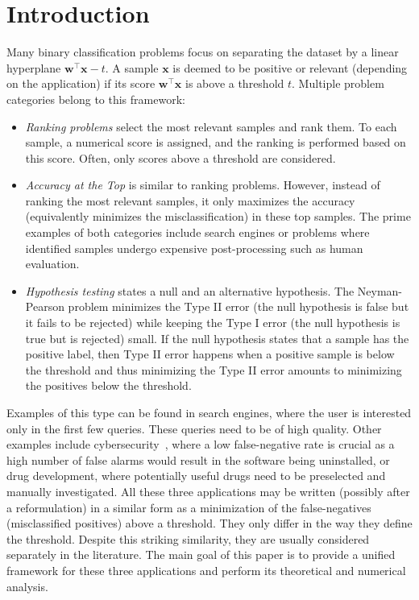\chapter{Introduction}

Many binary classification problems focus on separating the dataset by a linear hyperplane $\bm{w}^\top \bm{x} - t$. A sample $\bm{x}$ is deemed to be positive or relevant (depending on the application) if its score $\bm{w}^\top \bm{x}$ is above a threshold $t$. Multiple problem categories belong to this framework:
\begin{itemize}
  \item \textit{Ranking problems} select the most relevant samples and rank them. To each sample, a numerical score is assigned, and the ranking is performed based on this score. Often, only scores above a threshold are considered.
  \item \textit{Accuracy at the Top} is similar to ranking problems. However, instead of ranking the most relevant samples, it only maximizes the accuracy (equivalently minimizes the misclassification) in these top samples. The prime examples of both categories include search engines or problems where identified samples undergo expensive post-processing such as human evaluation.
  \item \textit{Hypothesis testing} states a null and an alternative hypothesis. The Neyman-Pearson problem minimizes the Type II error (the null hypothesis is false but it fails to be rejected) while keeping the Type I error (the null hypothesis is true but is rejected) small. If the null hypothesis states that a sample has the positive label, then Type II error happens when a positive sample is below the threshold and thus minimizing the Type II error amounts to minimizing the positives below the threshold.
\end{itemize}
Examples of this type can be found in search engines, where the user is interested only in the first few queries. These queries need to be of high quality. Other examples include cybersecurity~\cite{grill2016learning}, where a low false-negative rate is crucial as a high number of false alarms would result in the software being uninstalled, or drug development, where potentially useful drugs need to be preselected and manually investigated. All these three applications may be written (possibly after a reformulation) in a similar form as a minimization of the false-negatives (misclassified positives) above a threshold. They only differ in the way they define the threshold. Despite this striking similarity, they are usually considered separately in the literature. The main goal of this paper is to provide a unified framework for these three applications and perform its theoretical and numerical analysis.

